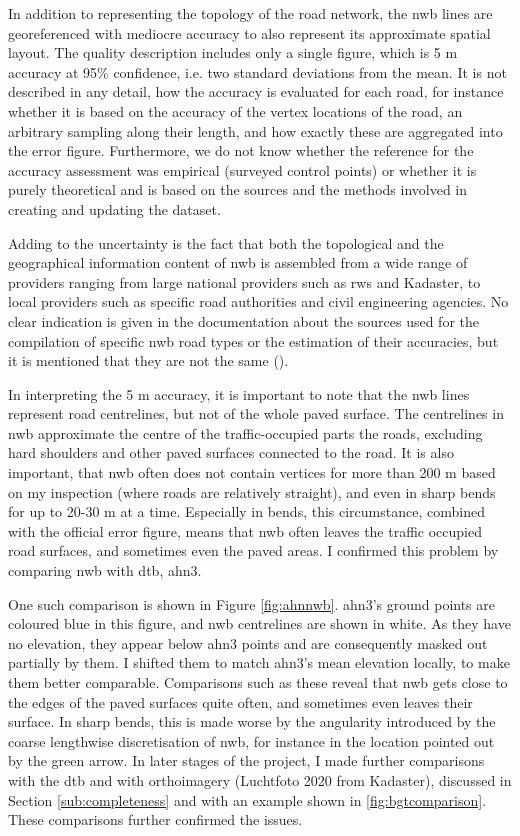 In addition to representing the topology of the road network, the \ac{nwb} lines are georeferenced with mediocre accuracy to also represent its approximate spatial layout. The quality description includes only a single figure, which is 5 m accuracy at 95\% confidence, i.e. two standard deviations from the mean. It is not described in any detail, how the accuracy is evaluated for each road, for instance whether it is based on the accuracy of the vertex locations of the road, an arbitrary sampling along their length, and how exactly these are aggregated into the error figure. Furthermore, we do not know whether the reference for the accuracy assessment was empirical (surveyed control points) or whether it is purely theoretical and is based on the sources and the methods involved in creating and updating the dataset.

Adding to the uncertainty is the fact that both the topological and the geographical information content of \ac{nwb} is assembled from a wide range of providers ranging from large national providers such as \ac{rws} and Kadaster, to local providers such as specific road authorities and civil engineering agencies. No clear indication is given in the documentation about the sources used for the compilation of specific \ac{nwb} road types or the estimation of their accuracies, but it is mentioned that they are not the same (\cite{nwb_docs}).

In interpreting the 5 m accuracy, it is important to note that the \ac{nwb} lines represent road centrelines, but not of the whole paved surface. The centrelines in \ac{nwb} approximate the centre of the traffic-occupied parts the roads, excluding hard shoulders and other paved surfaces connected to the road. It is also important, that \ac{nwb} often does not contain vertices for more than 200 m based on my inspection (where roads are relatively straight), and even in sharp bends for up to 20-30 m at a time. Especially in bends, this circumstance, combined with the official error figure, means that \ac{nwb} often leaves the traffic occupied road surfaces, and sometimes even the paved areas. I confirmed this problem by comparing \ac{nwb} with \ac{dtb}, \ac{ahn3}.

One such comparison is shown in Figure \ref{fig:ahnnwb}. \ac{ahn3}'s ground points are coloured blue in this figure, and \ac{nwb} centrelines are shown in white. As they have no elevation, they appear below \ac{ahn3} points and are consequently masked out partially by them. I shifted them to match \ac{ahn3}'s mean elevation locally, to make them better comparable. Comparisons such as these reveal that \ac{nwb} gets close to the edges of the paved surfaces quite often, and sometimes even leaves their surface. In sharp bends, this is made worse by the angularity introduced by the coarse lengthwise discretisation of \ac{nwb}, for instance in the location pointed out by the green arrow. In later stages of the project, I made further comparisons with the \ac{dtb} and with orthoimagery (Luchtfoto 2020 from Kadaster), discussed in Section \ref{sub:completeness} and with an example shown in \ref{fig:bgtcomparison}. These comparisons further confirmed the issues.

